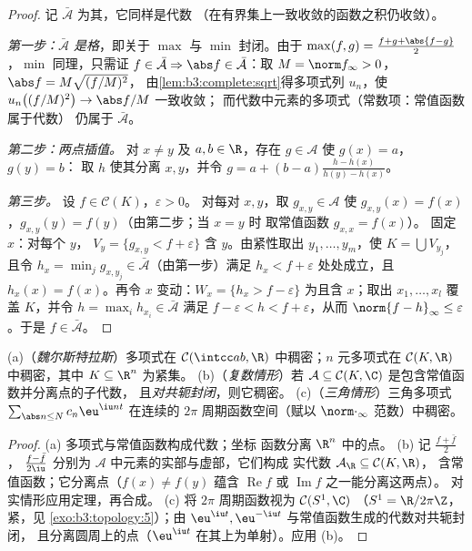 \begin{proof}
记 $\bar{\mathcal A}$ 为其，它同样是代数
（在有界集上一致收敛的函数之积仍收敛）。

\emph{第一步：$\bar{\mathcal A}$ 是格}，即关于
$\max$ 与 $\min$ 封闭。由于 $\max(f,g) = \frac{f + g +
\abs{f-g}}2$，$\min$ 同理，只需证 $f \in
\bar{\mathcal A} \Rightarrow \abs f \in \bar{\mathcal A}$：取
$M = \norm f_\infty > 0$，$\abs f = M\sqrt{(f/M)^2}$，
由\cref{lem:b3:complete:sqrt}得多项式列 $u_n$，使
$u_n\bigl((f/M)^2\bigr) \to \abs f/M$ 一致收敛；
而代数中元素的多项式（常数项：常值函数属于代数）
仍属于 $\bar{\mathcal A}$。

\emph{第二步：两点插值。} 对 $x \neq y$ 及 $a,
b \in \R$，存在 $g \in \mathcal A$ 使 $g(x) = a$，$g(y) = b$：
取 $h$ 使其分离 $x, y$，并令 $g = a + (b -
a)\frac{h - h(x)}{h(y) - h(x)}$。

\emph{第三步。} 设 $f \in \mathcal C(K)$，$\varepsilon > 0$。
对每对 $x, y$，取 $g_{x,y} \in \mathcal A$ 使
$g_{x,y}(x) = f(x)$，$g_{x,y}(y) = f(y)$（由第二步；当 $x = y$ 时
取常值函数 $g_{x,x} = f(x)$）。
固定 $x$：对每个 $y$， $V_y = \{g_{x,y} < f +
\varepsilon\}$ 含 $y$。由紧性取出 $y_1, \dots,
y_m$，使 $K = \bigcup V_{y_j}$，且令 $h_x = \min_j g_{x, y_j}
\in \bar{\mathcal A}$（由第一步）满足 $h_x < f +
\varepsilon$ 处处成立，且 $h_x(x) = f(x)$。再令 $x$ 变动：$W_x =
\{h_x > f - \varepsilon\}$ 为且含 $x$；取出 $x_1,
\dots, x_l$ 覆盖 $K$，并令 $h = \max_i h_{x_i} \in
\bar{\mathcal A}$ 满足 $f - \varepsilon < h < f +
\varepsilon$，从而 $\norm{f - h}_\infty \leq \varepsilon$。于是
$f \in \bar{\mathcal A}$。
\end{proof}

\begin{corollary}\label{cor:b3:complete:weierstrass}
(a)（\emph{魏尔斯特拉斯}）多项式在 $\mathcal
C(\intcc ab, \R)$ 中稠密；$n$ 元多项式在
$\mathcal C(K, \R)$ 中稠密，其中 $K \subseteq \R^n$ 为紧集。
(b)（\emph{复数情形}）若 $\mathcal A \subseteq \mathcal
C(K, \C)$ 是包含常值函数并分离点的子代数，
且\emph{对共轭封闭}，则它稠密。
(c)（\emph{三角情形}）三角多项式
$\sum_{\abs n \leq N}c_n\eu^{\iu n t}$ 在连续的
$2\pi$ 周期函数空间（赋以
$\norm\cdot_\infty$ 范数）中稠密。
\end{corollary}

\begin{proof}
(a) 多项式与常值函数构成代数；坐标
函数分离 $\R^n$ 中的点。
(b) 记 $\frac{f + \bar f}2$，
$\frac{f - \bar f}{2\iu}$ 分别为 $\mathcal A$ 中元素的实部与虚部，它们构成
实代数 $\mathcal A_\R \subseteq \mathcal C(K, \R)$，
含常值函数；它分离点（$f(x) \ne f(y)$ 蕴含
$\operatorname{Re}f$ 或 $\operatorname{Im}f$ 之一能分离这两点）。
对实情形应用定理，再合成。
(c) 将 $2\pi$ 周期函数视为 $\mathcal C(S^1, \C)$
（$S^1 = \R/2\pi\Z$，紧，见
\cref{exo:b3:topology:5}）；由
$\eu^{\iu t}, \eu^{-\iu t}$ 与常值函数生成的代数对共轭封闭，
且分离圆周上的点（$\eu^{\iu t}$
在其上为单射）。应用 (b)。
\end{proof}

